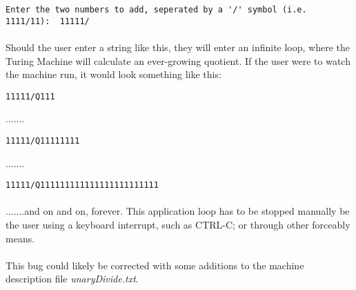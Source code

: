 \documentclass[12pt]{article}
\begin{document}
\begin{verbatim}
Enter the two numbers to add, seperated by a '/' symbol (i.e. 1111/11):  11111/
\end{verbatim}

\paragraph{}
Should the user enter a string like this, they will enter an infinite loop, 
where the Turing Machine will calculate an ever-growing quotient.  If the user 
were to watch the machine run, it would look something like this:

\begin{verbatim}
11111/Q111
\end{verbatim}
.......
\begin{verbatim}
11111/Q11111111
\end{verbatim}
.......
\begin{verbatim}
11111/Q111111111111111111111111
\end{verbatim}
\paragraph{}
.......and on and on, forever.  This application loop has to be stopped 
manually be the user using a keyboard interrupt, such as CTRL-C; or 
through other forceably means.

\paragraph{}
This bug could likely be corrected with some additions to the machine 
description file \textit{unaryDivide.txt}.
\end{document}
